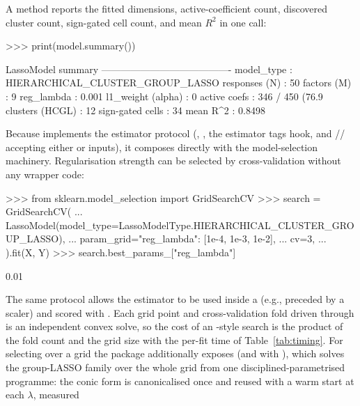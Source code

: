 \documentclass[article]{jss}
\begin{document}
A  method reports the fitted dimensions, active-coefficient
count, discovered cluster count, sign-gated cell count, and mean $R^2$ in
one call:
%
\begin{CodeChunk}
\begin{CodeInput}
>>> print(model.summary())
\end{CodeInput}
\begin{CodeOutput}
LassoModel summary
----------------------------------------
model_type        : HIERARCHICAL_CLUSTER_GROUP_LASSO
responses (N)     : 50
factors (M)       : 9
reg_lambda        : 0.001
l1_weight (alpha) : 0
active coefs      : 346 / 450 (76.9%
clusters (HCGL)   : 12
sign-gated cells  : 34
mean R^2          : 0.8498
\end{CodeOutput}
\end{CodeChunk}
%
Because  implements the  estimator
protocol (, , the estimator tags hook,
and // accepting either 
or  inputs), it composes directly with the
 model-selection machinery. Regularisation strength can
be selected by cross-validation without any wrapper code:
%
\begin{CodeChunk}
\begin{CodeInput}
>>> from sklearn.model_selection import GridSearchCV
>>> search = GridSearchCV(
...     LassoModel(model_type=LassoModelType.HIERARCHICAL_CLUSTER_GROUP_LASSO),
...     param_grid={"reg_lambda": [1e-4, 1e-3, 1e-2]},
...     cv=3,
... ).fit(X, Y)
>>> search.best_params_["reg_lambda"]
\end{CodeInput}
\begin{CodeOutput}
0.01
\end{CodeOutput}
\end{CodeChunk}
%
The same protocol allows the estimator to be used inside a
 (e.g., preceded by a scaler) and scored
with . Each grid point and cross-validation fold driven through
 is an independent convex solve, so the cost of an
-style search is the product of the fold count and the
grid size with the per-fit time of Table~\ref{tab:timing}. For selecting
 over a grid the package additionally exposes
 (and  with
), which solves the group-LASSO family over the
whole grid from one disciplined-parametrised programme: the conic form is
canonicalised once and reused with a warm start at each $\lambda$, measured
\end{document}
